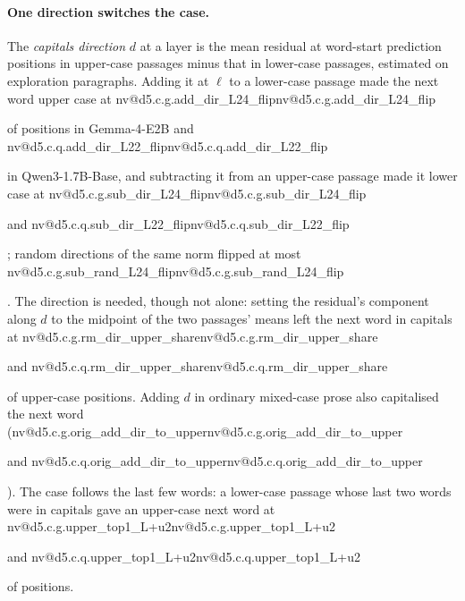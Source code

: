 \documentclass[11pt]{article}
\makeatletter
\newcommand{\nv}[1]{\ifcsname nv@#1\endcsname\csname nv@#1\endcsname\else\PackageError{numbers}{Unknown number key #1}{}\fi}
\newcommand{\qbig}{Qwen3-1.7B-Base}
\newcommand{\gm}{Gemma-4-E2B}
\newcommand{\DG}[1]{\nv{d5.c.g.#1}}
\newcommand{\DQ}[1]{\nv{d5.c.q.#1}}
\makeatother
\begin{document}
\paragraph{One direction switches the case.} The \emph{capitals direction} $d$ at a layer is the mean residual at word-start prediction positions in upper-case passages minus that in lower-case passages, estimated on exploration paragraphs. Adding it at $\ell$ to a lower-case passage made the next word upper case at \DG{add_dir_L24_flip} of positions in \gm{} and \DQ{add_dir_L22_flip} in \qbig{}, and subtracting it from an upper-case passage made it lower case at \DG{sub_dir_L24_flip} and \DQ{sub_dir_L22_flip}; random directions of the same norm flipped at most \DG{sub_rand_L24_flip}. The direction is needed, though not alone: setting the residual's component along $d$ to the midpoint of the two passages' means left the next word in capitals at \DG{rm_dir_upper_share} and \DQ{rm_dir_upper_share} of upper-case positions. Adding $d$ in ordinary mixed-case prose also capitalised the next word (\DG{orig_add_dir_to_upper} and \DQ{orig_add_dir_to_upper}). The case follows the last few words: a lower-case passage whose last two words were in capitals gave an upper-case next word at \DG{upper_top1_L+u2} and \DQ{upper_top1_L+u2} of positions.
\end{document}
